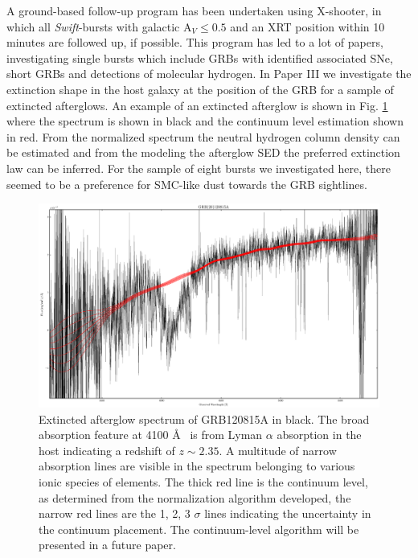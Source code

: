 A ground-based follow-up program has been undertaken using X-shooter, in which
all \textit{Swift}-bursts with galactic A$_{V} \leq 0.5$ and an XRT position
within 10 minutes are followed up, if possible. This program has led to a lot of
papers, investigating single bursts \citep[e.g.][to mention some]{Sparre2011,
DElia2014, Kruhler2013a, Xu2013a, DeUgartePostigo2014, Schulze2014a, Japelj2015,
Hartoog2015} which include GRBs with identified associated SNe, short GRBs and
detections of molecular hydrogen. 
In Paper III \citep{Japelj2015} we investigate the extinction shape in the host
galaxy at the position of the GRB for a sample of extincted afterglows. An
example of an extincted afterglow is shown in Fig. \ref{fig:intro:grbext} where
the spectrum is shown in black and the continuum level estimation shown in red.
From the normalized spectrum the neutral hydrogen column density can be
estimated and from the modeling the afterglow SED the preferred extinction law
can be inferred. For the sample of eight bursts we investigated here, there
seemed to be a preference for SMC-like dust towards the GRB sightlines. 
\begin{figure}[htb]
	\includegraphics[width=\textwidth]{gfx/normspec}
	\caption{Extincted afterglow spectrum of GRB120815A in black. The broad
absorption feature at 4100 \AA~ is from Lyman $\alpha$ absorption in the host
indicating a redshift of $z \sim 2.35$. A multitude of narrow absorption lines
are visible in the spectrum belonging to various ionic species of elements. The
thick red line is the continuum level, as determined from the normalization
algorithm developed, the narrow red lines are the 1, 2, 3 $\sigma$ lines
indicating the uncertainty in the continuum placement. The continuum-level
algorithm will be presented in a future paper. }
	\label{fig:intro:grbext}
\end{figure}
